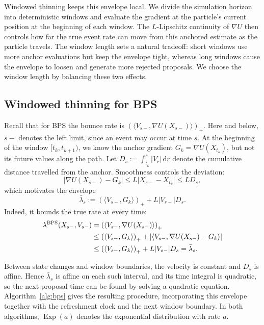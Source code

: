 \documentclass{amsart}
\theoremstyle{plain}
\theoremstyle{definition}
\theoremstyle{remark}
\newcommand{\ud}{\,\mathrm{d}}
\newcommand{\abs}[1]{\lvert#1\rvert}
\newcommand{\1}{\mathbf 1}
\newcommand{\dd}{\ud}
\newcommand{\ip}[2]{\langle #1,#2\rangle}
\newcommand{\pos}[1]{\left(#1\right)_+}
\newcommand{\bps}{{\rm BPS}}
\begin{document}
Windowed thinning keeps this envelope local.  We divide the simulation horizon
into deterministic windows and evaluate the gradient at the particle's
current position at the beginning of each window.   The $L$-Lipschitz continuity of $\nabla U$ then controls
how far the true event rate can move from this anchored estimate as the
particle travels.  The window length sets a natural tradeoff: short windows
use more anchor evaluations but keep the envelope tight, whereas long windows
cause the envelope to loosen and
generate more rejected proposals.  We choose the window length by balancing
these two effects.

\subsection{Windowed thinning for BPS}\label{ssec:wt-bps}

Recall that for BPS the bounce rate is
$\pos{\ip{V_{s-}}{\nabla U(X_{s-})}}$.  Here and below, $s-$ denotes the left
limit, since an event may occur at time $s$.
At the beginning of the window $[t_k,t_{k+1})$, we know the anchor gradient
$G_k=\nabla U(X_{t_k})$, but not its future values along the path.  Let
$D_s:=\int_{t_k}^s\abs{V_r}\dd r$ denote the cumulative distance travelled from the
anchor.  Smoothness controls the deviation:
\[
        \abs{\nabla U(X_{s-})-G_k}
        \le L\abs{X_{s-}-X_{t_k}}
        \le L D_s,
\]
which motivates the envelope
\begin{equation}\label{eq:bps-envelope}
        \bar\lambda_s
        :=\pos{\ip{V_{s-}}{G_k}}+L\abs{V_{s-}}D_s.
\end{equation}
Indeed, it bounds the true rate at every time:
\begin{align*}
        \lambda^{\bps}(X_{s-},V_{s-})
        &=\pos{\ip{V_{s-}}{\nabla U(X_{s-})}}\\
        &\le\pos{\ip{V_{s-}}{G_k}}
             +\abs{\ip{V_{s-}}{\nabla U(X_{s-})-G_k}}\\
        &\le\pos{\ip{V_{s-}}{G_k}}+L\abs{V_{s-}}D_s
        =\bar\lambda_s.
\end{align*}

Between state changes and window boundaries, the velocity is constant and
$D_s$ is affine.  Hence $\bar\lambda_s$ is affine on each such interval, and
its time integral is quadratic, so the next proposal time can be found by
solving a quadratic equation.
Algorithm~\ref{alg:bps} gives the resulting procedure, incorporating this
envelope together with the refreshment clock and the next window boundary.
In both algorithms, $\operatorname{Exp}(a)$ denotes the exponential
distribution with rate $a$.
\end{document}
